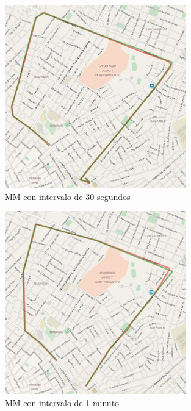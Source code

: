 \begin{figure}[!htb]
	\centering
	\includegraphics[width=0.7\textwidth]{capitulos/7/figuras/figura1.jpg}
	\caption{\label{fig:mm_30s} MM con intervalo de 30 segundos}	
\end{figure}

\begin{figure}[!htb]
	\centering
	\includegraphics[width=0.7\textwidth]{capitulos/7/figuras/figura2.jpg}
	\caption{\label{fig:mm_1m} MM con intervalo de 1 minuto}	
\end{figure}

